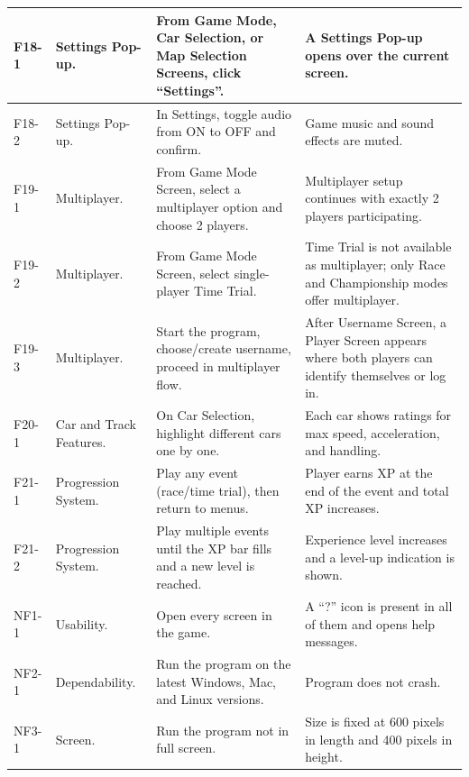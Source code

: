 \documentclass[12pt]{article}
\begin{document}
\begin{longtable}{|l|p{}|p{}|p{}|}
F18-1 & Settings Pop-up. &
From Game Mode, Car Selection, or Map Selection Screens, click “Settings”. &
A Settings Pop-up opens over the current screen. \\
\hline

F18-2 & Settings Pop-up. &
In Settings, toggle audio from ON to OFF and confirm. &
Game music and sound effects are muted. \\
\hline

F19-1 & Multiplayer. &
From Game Mode Screen, select a multiplayer option and choose 2 players. &
Multiplayer setup continues with exactly 2 players participating. \\
\hline

F19-2 & Multiplayer. &
From Game Mode Screen, select single-player Time Trial. &
Time Trial is not available as multiplayer; only Race and Championship modes offer multiplayer. \\
\hline

F19-3 & Multiplayer. &
Start the program, choose/create username, proceed in multiplayer flow. &
After Username Screen, a Player Screen appears where both players can identify themselves or log in. \\
\hline

F20-1 & Car and Track Features. &
On Car Selection, highlight different cars one by one. &
Each car shows ratings for max speed, acceleration, and handling. \\
\hline

F21-1 & Progression System. &
Play any event (race/time trial), then return to menus. &
Player earns XP at the end of the event and total XP increases. \\
\hline

F21-2 & Progression System. &
Play multiple events until the XP bar fills and a new level is reached. &
Experience level increases and a level-up indication is shown. \\
\hline

NF1-1 & Usability. &
Open every screen in the game. &
A “?” icon is present in all of them and opens help messages. \\
\hline

NF2-1 & Dependability. &
Run the program on the latest Windows, Mac, and Linux versions. &
Program does not crash. \\
\hline

NF3-1 & Screen. &
Run the program not in full screen. &
Size is fixed at 600 pixels in length and 400 pixels in height. \\
\hline


\end{longtable}
\end{document}
